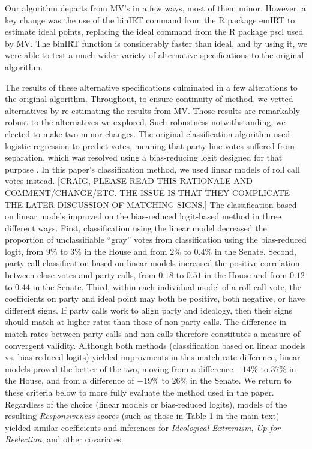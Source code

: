 \documentclass[12pt]{article}
\begin{document}
Our algorithm departs from MV's in a few ways, most of them minor.  However, a key change was the use of the \textsf{binIRT} command from the \textsf{R} package \textsf{emIRT} \citep{Imai:2016} to estimate ideal points, replacing the \textsf{ideal} command from the \textsf{R} package \textsf{pscl} \citep{Jackman:2015} used by MV.  The \textsf{binIRT} function is considerably faster than \textsf{ideal}, and by using it, we were able to test a much wider variety of alternative specifications to the original algorithm.

The results of these alternative specifications culminated in a few alterations to the original algorithm.
Throughout, to ensure continuity of method, we vetted alternatives by re-estimating the results from MV.
Those results are remarkably robust to the alternatives we explored.
Such robustness notwithstanding, we elected to make two minor changes.
The original classification algorithm used logistic regression to predict votes,
meaning that party-line votes suffered from separation, which was resolved using
a bias-reducing logit designed for that purpose \citep{Zorn:2005}.
In this paper's classification method, we used linear models of roll call votes
instead.
[CRAIG, PLEASE READ THIS RATIONALE AND COMMENT/CHANGE/ETC. THE ISSUE IS THAT THEY COMPLICATE THE LATER DISCUSSION OF MATCHING SIGNS.]
The classification based on linear models improved
on the bias-reduced logit-based method in three different ways.
First, classification using the linear model decreased the proportion of
unclassifiable ``gray'' votes from classification using the bias-reduced logit,
from $9\%$ to $3\%$ in the House and
from $2\%$ to $0.4\%$ in the Senate.
Second, party call classification based on linear models increased the positive
correlation between close votes and party calls,
from $0.18$ to $0.51$ in the House and
from $0.12$ to $0.44$ in the Senate.
Third, within each individual model of a roll call vote, the coefficients on
party and ideal point may both be positive, both negative, or have different
signs.
If party calls work to align party and ideology, then their signs should
match at higher rates than those of non-party calls.
The difference in match rates between party calls and non-calls therefore
constitutes a measure of convergent validity.
Although both methods (classification based on linear models vs. bias-reduced
logits) yielded improvments in this match rate difference,
linear models proved the better of the two,
moving from a difference $-14\%$ to $37\%$ in the House,
and from a difference of $-19\%$ to $26\%$ in the Senate.
We return to these criteria below to more fully evaluate the method used
in the paper.
Regardless of the choice (linear models or bias-reduced logits), models of the
resulting \textit{Responsiveness} scores (such as those in Table 1 in the main
text) yielded similar coefficients and inferences for \textit{Ideological
Extremism}, \textit{Up for Reelection}, and other covariates.
\end{document}
